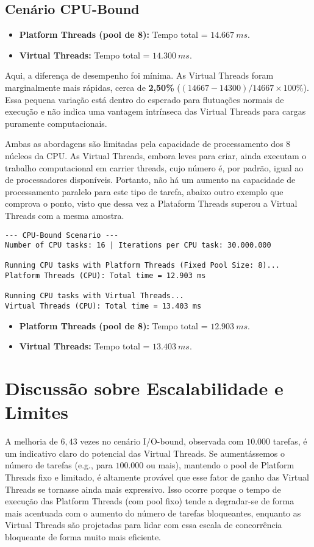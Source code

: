 \documentclass[12pt,a4paper]{article}
\begin{document}
\subsection{Cenário CPU-Bound}
\begin{itemize}
    \item \textbf{Platform Threads (pool de 8):} Tempo total = $14.667~ms$.
    \item \textbf{Virtual Threads:} Tempo total = $14.300~ms$.
\end{itemize}
Aqui, a diferença de desempenho foi mínima. As Virtual Threads foram marginalmente mais rápidas, cerca de \textbf{2,50\%} ($ (14667 - 14300) / 14667 \times 100\% $). Essa pequena variação está dentro do esperado para flutuações normais de execução e não indica uma vantagem intrínseca das Virtual Threads para cargas puramente computacionais.

Ambas as abordagens são limitadas pela capacidade de processamento dos 8 núcleos da CPU. As Virtual Threads, embora leves para criar, ainda executam o trabalho computacional em carrier threads, cujo número é, por padrão, igual ao de processadores disponíveis. Portanto, não há um aumento na capacidade de processamento paralelo para este tipo de tarefa, abaixo outro exemplo que comprova o ponto, visto que dessa vez a Plataform Threads superou a Virtual Threads com a mesma amostra.
\begin{verbatim}
--- CPU-Bound Scenario ---
Number of CPU tasks: 16 | Iterations per CPU task: 30.000.000

Running CPU tasks with Platform Threads (Fixed Pool Size: 8)...
Platform Threads (CPU): Total time = 12.903 ms

Running CPU tasks with Virtual Threads...
Virtual Threads (CPU): Total time = 13.403 ms
\end{verbatim}

\begin{itemize}
    \item \textbf{Platform Threads (pool de 8):} Tempo total = $12.903~ms$.
    \item \textbf{Virtual Threads:} Tempo total = $13.403~ms$.
\end{itemize}


\section{Discussão sobre Escalabilidade e Limites}
A melhoria de $6,43$ vezes no cenário I/O-bound, observada com $10.000$ tarefas, é um indicativo claro do potencial das Virtual Threads. Se aumentássemos o número de tarefas (e.g., para $100.000$ ou mais), mantendo o pool de Platform Threads fixo e limitado, é altamente provável que esse fator de ganho das Virtual Threads se tornasse ainda mais expressivo. Isso ocorre porque o tempo de execução das Platform Threads (com pool fixo) tende a degradar-se de forma mais acentuada com o aumento do número de tarefas bloqueantes, enquanto as Virtual Threads são projetadas para lidar com essa escala de concorrência bloqueante de forma muito mais eficiente.
\end{document}
